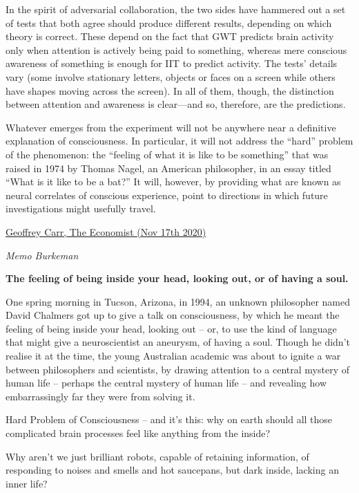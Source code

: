 \documentclass[
]{book}
\begin{document}
In the spirit of adversarial collaboration, the two sides have hammered out a set of tests that both agree should produce different results, depending on which theory is correct. These depend on the fact that GWT predicts brain activity only when attention is actively being paid to something, whereas mere conscious awareness of something is enough for IIT to predict activity. The tests' details vary (some involve stationary letters, objects or faces on a screen while others have shapes moving across the screen). In all of them, though, the distinction between attention and awareness is clear---and so, therefore, are the predictions.

Whatever emerges from the experiment will not be anywhere near a definitive explanation of consciousness. In particular, it will not address the ``hard'' problem of the phenomenon: the ``feeling of what it is like to be something'' that was raised in 1974 by Thomas Nagel, an American philosopher, in an essay titled ``What is it like to be a bat?'' It will, however, by providing what are known as neural correlates of conscious experience, point to directions in which future investigations might usefully travel.

\href{https://www.economist.com/the-world-ahead/2020/11/17/two-rival-theories-of-consciousness-are-put-to-the-test}{Geoffrey Carr, The Economist (Nov 17th 2020)}

\emph{Memo Burkeman}

\textbf{The feeling of being inside your head, looking out, or of having a soul.}

One spring morning in Tucson, Arizona, in 1994, an unknown philosopher named David Chalmers got up to give a talk on consciousness, by which he meant the feeling of being inside your head, looking out -- or, to use the kind of language that might give a neuroscientist an aneurysm, of having a soul. Though he didn't realise it at the time, the young Australian academic was about to ignite a war between philosophers and scientists, by drawing attention to a central mystery of human life -- perhaps the central mystery of human life -- and revealing how embarrassingly far they were from solving it.

Hard Problem of Consciousness -- and it's this: why on earth should all those complicated brain processes feel like anything from the inside?

Why aren't we just brilliant robots, capable of retaining information, of responding to noises and smells and hot saucepans, but dark inside, lacking an inner life?
\end{document}

